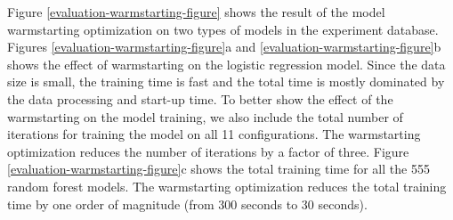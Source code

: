 Figure \ref{evaluation-warmstarting-figure} shows the result of the model warmstarting optimization on two types of models in the experiment database.
Figures \ref{evaluation-warmstarting-figure}a and \ref{evaluation-warmstarting-figure}b shows the effect of warmstarting on the logistic regression model.
Since the data size is small, the training time is fast and the total time is mostly dominated by the data processing and start-up time.
To better show the effect of the warmstarting on the model training, we also include the total number of iterations for training the model on all 11 configurations.
The warmstarting optimization reduces the number of iterations by a factor of three.
Figure \ref{evaluation-warmstarting-figure}c shows the total training time for all the 555 random forest models.
The warmstarting optimization reduces the total training time by one order of magnitude (from 300 seconds to 30 seconds).

